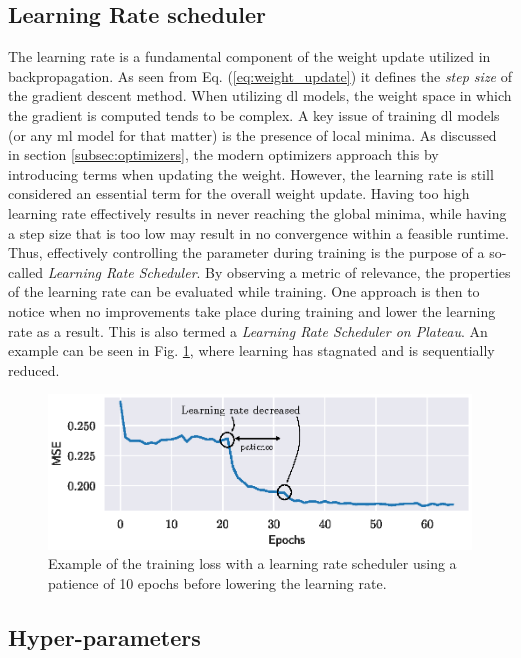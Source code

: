 \subsection{Learning Rate scheduler}\label{subsec:lr_scheduler}
The learning rate is a fundamental component of the weight update utilized in backpropagation. As seen from Eq. (\ref{eq:weight_update}) it defines the \emph{step size} of the gradient descent method. When utilizing \gls{dl} models, the weight space in which the gradient is computed tends to be complex. A key issue of training \gls{dl} models (or any \gls{ml} model for that matter) is the presence of local minima. As discussed in section \ref{subsec:optimizers}, the modern optimizers approach this by introducing terms when updating the weight. However, the learning rate is still considered an essential term for the overall weight update. Having too high learning rate effectively results in never reaching the global minima, while having a step size that is too low may result in no convergence within a feasible runtime. Thus, effectively controlling the parameter during training is the purpose of a so-called \emph{Learning Rate Scheduler}. By observing a metric of relevance, the properties of the learning rate can be evaluated while training. One approach is then to notice when no improvements take place during training and lower the learning rate as a result. This is also termed a \emph{Learning Rate Scheduler on Plateau}. An example can be seen in Fig. \ref{fig:learning_rate}, where learning has stagnated and is sequentially reduced.

\begin{figure}
    \includegraphics[]{chapters/figures/learningrate_scheduler_example.eps}
    \caption{Example of the training loss with a learning rate scheduler using a patience of 10 epochs before lowering the learning rate. }\label{fig:learning_rate}
\end{figure}

\subsection{Hyper-parameters}


